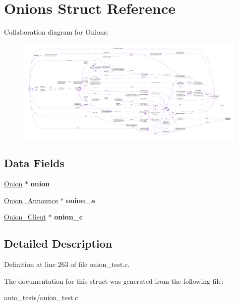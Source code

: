 \hypertarget{struct_onions}{\section{Onions Struct Reference}
\label{struct_onions}
}


Collaboration diagram for Onions\+:\nopagebreak
\begin{figure}[H]
\begin{center}
\leavevmode
\includegraphics[width=350pt]{struct_onions__coll__graph}
\end{center}
\end{figure}
\subsection*{Data Fields}
\begin{DoxyCompactItemize}
\item 
\hypertarget{struct_onions_a66fb4bf67c711a5ed3e7bbecec7fde30}{\hyperlink{struct_onion}{Onion} $\ast$ {\bfseries onion}}\label{struct_onions_a66fb4bf67c711a5ed3e7bbecec7fde30}

\item 
\hypertarget{struct_onions_a3a345721fb6be385f4b4519679a4609f}{\hyperlink{struct_onion___announce}{Onion\+\_\+\+Announce} $\ast$ {\bfseries onion\+\_\+a}}\label{struct_onions_a3a345721fb6be385f4b4519679a4609f}

\item 
\hypertarget{struct_onions_ae202b81f9a2c2fa80fd310a0996795fc}{\hyperlink{struct_onion___client}{Onion\+\_\+\+Client} $\ast$ {\bfseries onion\+\_\+c}}\label{struct_onions_ae202b81f9a2c2fa80fd310a0996795fc}

\end{DoxyCompactItemize}


\subsection{Detailed Description}


Definition at line 263 of file onion\+\_\+test.\+c.



The documentation for this struct was generated from the following file\+:\begin{DoxyCompactItemize}
\item 
auto\+\_\+tests/onion\+\_\+test.\+c\end{DoxyCompactItemize}
